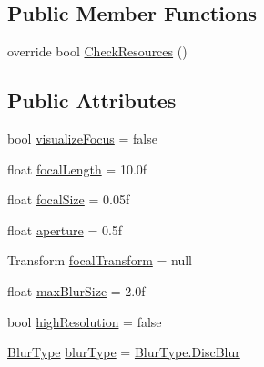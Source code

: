 \subsection*{Public Member Functions}
\begin{DoxyCompactItemize}
\item 
override bool \mbox{\hyperlink{class_unity_standard_assets_1_1_image_effects_1_1_depth_of_field_a09a1b9c73fd7e06974c88090eff0b951}{Check\+Resources}} ()
\end{DoxyCompactItemize}
\subsection*{Public Attributes}
\begin{DoxyCompactItemize}
\item 
bool \mbox{\hyperlink{class_unity_standard_assets_1_1_image_effects_1_1_depth_of_field_abcf9fe36492431c8daf4b52bd1c9f5bd}{visualize\+Focus}} = false
\item 
float \mbox{\hyperlink{class_unity_standard_assets_1_1_image_effects_1_1_depth_of_field_a461e6e4253f382bb70aef785c866f9b6}{focal\+Length}} = 10.\+0f
\item 
float \mbox{\hyperlink{class_unity_standard_assets_1_1_image_effects_1_1_depth_of_field_a1f711ad0798393daa10150cd4581da7d}{focal\+Size}} = 0.\+05f
\item 
float \mbox{\hyperlink{class_unity_standard_assets_1_1_image_effects_1_1_depth_of_field_aad2505c448040020508a6289c8cadc1e}{aperture}} = 0.\+5f
\item 
Transform \mbox{\hyperlink{class_unity_standard_assets_1_1_image_effects_1_1_depth_of_field_a9aa4bb32f68044e2ffd1b2b518d41157}{focal\+Transform}} = null
\item 
float \mbox{\hyperlink{class_unity_standard_assets_1_1_image_effects_1_1_depth_of_field_a39c086afc139c568f0f0d5e46da060db}{max\+Blur\+Size}} = 2.\+0f
\item 
bool \mbox{\hyperlink{class_unity_standard_assets_1_1_image_effects_1_1_depth_of_field_a9734134cde7d90a9c3e65004441835f0}{high\+Resolution}} = false
\item 
\mbox{\hyperlink{class_unity_standard_assets_1_1_image_effects_1_1_depth_of_field_ab7aaacbb098cf0b20da9d9b6e502d7c7}{Blur\+Type}} \mbox{\hyperlink{class_unity_standard_assets_1_1_image_effects_1_1_depth_of_field_aa2b567bd047507f170c15dedc44cb50d}{blur\+Type}} = \mbox{\hyperlink{class_unity_standard_assets_1_1_image_effects_1_1_depth_of_field_ab7aaacbb098cf0b20da9d9b6e502d7c7a26d395bd59cbf7cded165ca9e16d534b}{Blur\+Type.\+Disc\+Blur}}

\end{DoxyCompactItemize}
